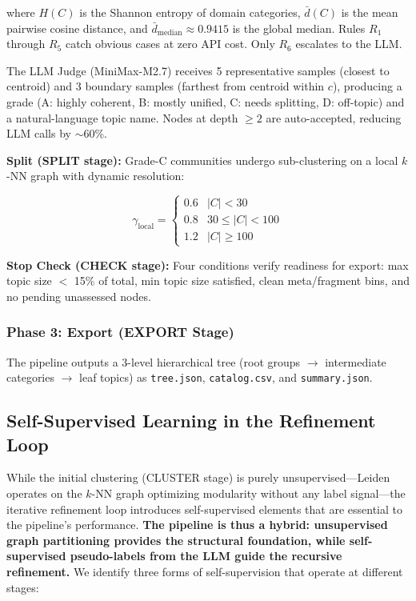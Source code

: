 \documentclass[10pt,twocolumn,twoside]{article}
\begin{document}
where $H(C)$ is the Shannon entropy of domain categories, $\bar{d}(C)$ is the mean pairwise 
cosine distance, and $\bar{d}_{\text{median}} \approx 0.9415$ is the global median. Rules $R_1$ 
through $R_5$ catch obvious cases at zero API cost. Only $R_6$ escalates to the LLM.

The LLM Judge (MiniMax-M2.7) receives 5 representative samples (closest to centroid) and 3 
boundary samples (farthest from centroid within $c$), producing a grade (A: highly coherent, 
B: mostly unified, C: needs splitting, D: off-topic) and a natural-language topic name. 
Nodes at depth $\geq 2$ are auto-accepted, reducing LLM calls by $\sim$60\%.

\textbf{Split (SPLIT stage):} Grade-C communities undergo sub-clustering on a local $k$-NN 
graph with dynamic resolution:

\begin{equation}
    \gamma_{\text{local}} = 
    \begin{cases}
        0.6 & |C| < 30 \\
        0.8 & 30 \leq |C| < 100 \\
        1.2 & |C| \geq 100
    \end{cases}
    \label{eq:local_gamma}
\end{equation}

\textbf{Stop Check (CHECK stage):} Four conditions verify readiness for export: max topic size 
$<$ 15\% of total, min topic size satisfied, clean 
meta/fragment bins, and no pending unassessed nodes.

\subsubsection{Phase 3: Export (EXPORT Stage)}
The pipeline outputs a 3-level hierarchical tree (root groups $\rightarrow$ intermediate 
categories $\rightarrow$ leaf topics) as \texttt{tree.json}, \texttt{catalog.csv}, and 
\texttt{summary.json}.

\subsection{Self-Supervised Learning in the Refinement Loop}

While the initial clustering (CLUSTER stage) is purely unsupervised---Leiden operates on the 
$k$-NN graph optimizing modularity without any label signal---the iterative refinement loop 
introduces self-supervised elements that are essential to the pipeline's performance. 
\textbf{The pipeline is thus a hybrid: unsupervised graph partitioning provides the structural 
foundation, while self-supervised pseudo-labels from the LLM guide the recursive refinement.}
We identify three forms of self-supervision that operate at different stages:
\end{document}
